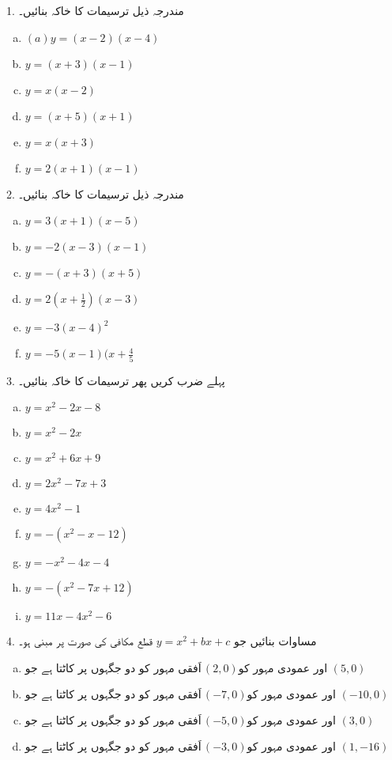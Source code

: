 
1.
مندرجہ ذیل ترسیمات کا خاکہ بنائیں۔
\begin{enumerate}[a.]
\item  \((a)y=(x-2)(x-4)\) 
\item \(y=(x+3)(x-1)\) 
\item \(y=x(x-2)\)
\item \(y=(x+5)(x+1)\) 
\item \(y=x(x+3)\) 
\item \(y=2(x+1)(x-1)\)
\end{enumerate}


2.
مندرجہ ذیل ترسیمات کا خاکہ بنائیں۔
\begin{enumerate}[a.]
\item \(y=3(x+1)(x-5)\)
\item \(y=-2(x-3)(x-1)\)
 \item \(y=-(x+3)(x+5)\)
\item \(y=2(x+\frac{1}{2})(x-3)\)
  \item \(y=-3(x-4)^{2}\quad \)
  \item \(y=-5(x-1)(x+\frac{4}{5} \)
\end{enumerate}
3.
پہلے ضرب کریں پھر ترسیمات کا خاکہ بنائیں۔
\begin{enumerate}[a.]
\item   \(y=x^{2}-2x-8 \) 
\item   \(y=x^{2}-2x \)
\item   \(y=x^{2}+6x+9\)
\item   \(y=2x^{2}-7x+3 \)
\item   \(y=4x^{2}-1\)
\item    \(y=-(x^{2}-x-12)\)
\item    \(y=-x^{2}-4x-4\) 
\item  \(y=-(x^{2}-7x+12)\) 
 \item \(y=11x-4x^{2}-6\)
\end{enumerate}
4.
مساوات بنائیں جو 
\(y=x^{2}+bx+c\)
قطع مکافی  کی صورت پر مبنی ہو۔\\
\begin{enumerate}[a.]
\item \(  \text{اَفقی مہور کو دو جگہوں پر کاٹتا ہے جو}\,(2,0)\text{اور عمودی مہور کو } (5,0)\)
\item \( \text{اَفقی مہور کو دو جگہوں پر کاٹتا ہے جو}\,(-7,0)\text{اور عمودی مہور کو } (-10,0)\)
\item \( \text{اَفقی مہور کو دو جگہوں پر کاٹتا ہے جو}\,(-5,0)\text{اور عمودی مہور کو } (3,0)\)
\item \( \text{اَفقی مہور کو دو جگہوں پر کاٹتا ہے جو}\,(-3,0)\text{اور عمودی مہور کو } (1,-16)\)
\end{enumerate}



